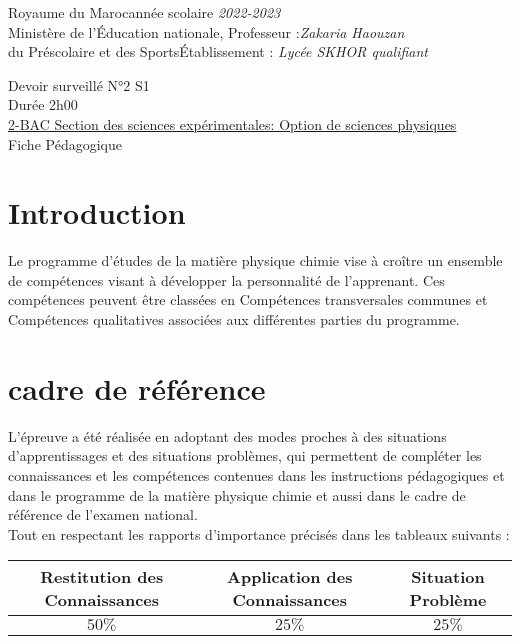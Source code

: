 \documentclass[12pt]{article}
\newcommand\headerMe[2]{\noindent{}#1\hfill#2}
\begin{document}
\headerMe{Royaume du Maroc}{année scolaire \emph{2022-2023}}\\
\headerMe{Ministère de l'Éducation nationale, }{  Professeur :\emph{Zakaria Haouzan}}\\
\headerMe{du Préscolaire et des Sports}{Établissement : \emph{Lycée SKHOR qualifiant}}\\

\begin{center}
Devoir surveillé N°2 S1 \\
Durée 2h00\\
\underline{2-BAC Section des sciences expérimentales: Option de sciences physiques}\\

    \vspace{.2cm}
\hrulefill
\Large{Fiche Pédagogique}
\hrulefill\\
\end{center}


\section[A]{Introduction }
\hspace{0.5cm}Le programme d'études de la matière physique chimie vise à croître un ensemble de compétences visant à développer la personnalité de l'apprenant. Ces compétences peuvent être classées en Compétences transversales communes et Compétences qualitatives associées aux différentes parties du programme.
\section{cadre de référence }
 \hspace{0.5cm}L'épreuve a été réalisée en adoptant des modes proches à des situations d'apprentissages et des situations problèmes, qui permettent de compléter les connaissances et les compétences contenues dans les instructions pédagogiques et dans le programme de la matière physique chimie et aussi dans le cadre de référence de l'examen national. 
 \\Tout en respectant les rapports d'importance précisés dans les tableaux suivants :
 \begin{center}
\begin{tabular}{|c||c||c|}
\hline
    \textbf{Restitution des Connaissances} & \textbf{Application des Connaissances} & \textbf{Situation Problème }\\
    \hline 
    $50\%$ & $25\%$ & $25\%$\\
    \hline
\end{tabular} 
\end{center}
\end{document}
